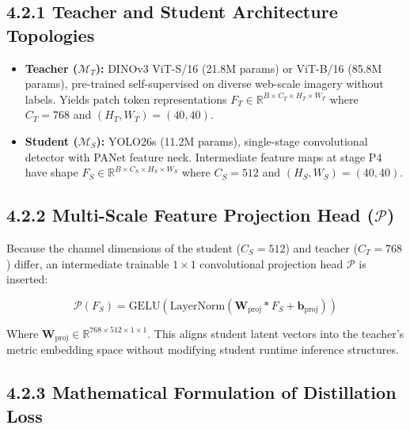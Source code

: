 \subsection{4.2.1 Teacher and Student Architecture
Topologies}\label{teacher-and-student-architecture-topologies}

\begin{itemize}
\tightlist
\item
  \textbf{Teacher (\(\mathcal{M}_T\)):} DINOv3 ViT-S/16 (21.8M params)
  or ViT-B/16 (85.8M params), pre-trained self-supervised on diverse
  web-scale imagery without labels. Yields patch token representations
  \(F_T \in \mathbb{R}^{B \times C_T \times H_T \times W_T}\) where
  \(C_T = 768\) and \((H_T, W_T) = (40, 40)\).
\item
  \textbf{Student (\(\mathcal{M}_S\)):} YOLO26s (11.2M params),
  single-stage convolutional detector with PANet feature neck.
  Intermediate feature maps at stage P4 have shape
  \(F_S \in \mathbb{R}^{B \times C_S \times H_S \times W_S}\) where
  \(C_S = 512\) and \((H_S, W_S) = (40, 40)\).
\end{itemize}

\subsection{\texorpdfstring{4.2.2 Multi-Scale Feature Projection Head
(\(\mathcal{P}\))}{4.2.2 Multi-Scale Feature Projection Head (\textbackslash mathcal\{P\})}}\label{multi-scale-feature-projection-head-mathcalp}

Because the channel dimensions of the student (\(C_S = 512\)) and
teacher (\(C_T = 768\)) differ, an intermediate trainable \(1\times 1\)
convolutional projection head \(\mathcal{P}\) is inserted:

\[\mathcal{P}(F_S) = \text{GELU}\left( \text{LayerNorm}\left( \mathbf{W}_{\text{proj}} * F_S + \mathbf{b}_{\text{proj}} \right) \right)\]

Where
\(\mathbf{W}_{\text{proj}} \in \mathbb{R}^{768 \times 512 \times 1 \times 1}\).
This aligns student latent vectors into the teacher's metric embedding
space without modifying student runtime inference structures.

\subsection{4.2.3 Mathematical Formulation of Distillation
Loss}\label{mathematical-formulation-of-distillation-loss}

